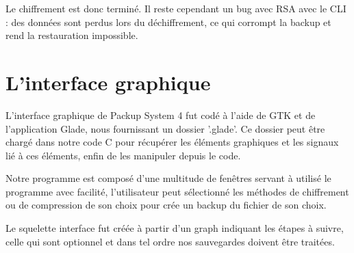     Le chiffrement est donc terminé.
    Il reste cependant un bug avec RSA avec le CLI : des données sont perdus lors du déchiffrement, ce qui corrompt la backup et rend la restauration impossible.
    
\newpage

\section{L'interface graphique}
    L'interface graphique de Packup System 4 fut codé à l'aide de GTK et de l'application Glade, nous fournissant un dossier '.glade'. Ce dossier peut être chargé dans notre code C pour récupérer les éléments graphiques et les signaux lié à ces éléments, enfin de les manipuler depuis le code.  
    
    Notre programme est composé d'une multitude de fenêtres servant à utilisé le programme avec facilité, l'utilisateur peut sélectionné les méthodes de chiffrement ou de compression de son choix pour crée un backup du fichier de son choix.
    
    Le squelette interface fut créée à partir d'un graph indiquant les étapes à suivre, celle qui sont optionnel et dans tel ordre nos sauvegardes doivent être traitées. \\ \\ \\
    
